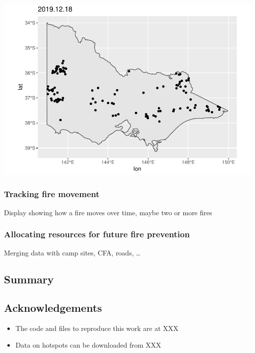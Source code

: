 \begin{Schunk}

\includegraphics[width=0.8\linewidth]{clustering_paper_files/figure-latex/unnamed-chunk-5-1} \end{Schunk}

\hypertarget{tracking-fire-movement}{%
\subsubsection{Tracking fire movement}\label{tracking-fire-movement}}

Display showing how a fire moves over time, maybe two or more fires

\hypertarget{allocating-resources-for-future-fire-prevention}{%
\subsubsection{Allocating resources for future fire
prevention}\label{allocating-resources-for-future-fire-prevention}}

Merging data with camp sites, CFA, roads, \ldots{}

\hypertarget{summary}{%
\subsection{Summary}\label{summary}}

\hypertarget{acknowledgements}{%
\subsection{Acknowledgements}\label{acknowledgements}}

\begin{itemize}
\tightlist
\item
  The code and files to reproduce this work are at XXX
\item
  Data on hotspots can be downloaded from XXX
\end{itemize}

